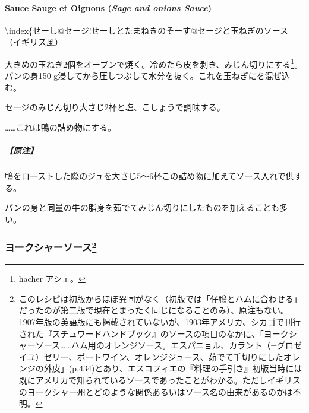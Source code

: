\begin{recette}
\hypertarget{sage-and-onions-sauce}{%
\paragraph{\texorpdfstring{Sauce Sauge et Oignons (\emph{Sage and onions
Sauce})}{Sauce Sauge et Oignons (Sage and onions Sauce)}}\label{sage-and-onions-sauce}}

\textbackslash{}index\{せーし@セージ!せーしとたまねきのそーす@セージと玉ねぎのソース（イギリス風）

大きめの玉ねぎ2個をオーブンで焼く。冷めたら皮を剥き、みじん切りにする\footnote{hacher
  アシェ。}。パンの身150
g浸してから圧しつぶして水分を抜く。これを玉ねぎにを混ぜ込む。

セージのみじん切り大さじ2杯と塩、こしょうで調味する。

\ldots{}\ldots{}これは鴨の詰め物にする。

\hypertarget{ux539fux6ce8-3}{%
\subparagraph{【原注】}\label{ux539fux6ce8-3}}

鴨をローストした際のジュを大さじ5〜6杯この詰め物に加えてソース入れで供する。

パンの身と同量の牛の脂身を茹でてみじん切りにしたものを加えることも多い。

\maeaki

\hypertarget{ux30e8ux30fcux30afux30b7ux30e3ux30fcux30bdux30fcux30b953}{%
\subsubsection[ヨークシャーソース]{\texorpdfstring{ヨークシャーソース\footnote{このレシピは初版からほぼ異同がなく（初版では「仔鴨とハムに合わせる」だったのが第二版で現在とまったく同じになることのみ）、原注もない。1907年版の英語版にも掲載されていないが、1903年アメリカ、シカゴで刊行された『\href{https://archive.org/details/stewardshandbook00whitiala}{スチュワードハンドブック}』のソースの項目のなかに、「ヨークシャーソース\ldots{}\ldots{}ハム用のオレンジソース。エスパニョル、カラント（=グロゼイユ）ゼリー、ポートワイン、オレンジジュース、茹でて千切りにしたオレンジの外皮」(p.434)とあり、エスコフィエの『料理の手引き』初版当時には既にアメリカで知られているソースであったことがわかる。ただしイギリスのヨークシャー州とどのような関係あるいはソース名の由来があるのかは不明。}}{ヨークシャーソース}}\label{ux30e8ux30fcux30afux30b7ux30e3ux30fcux30bdux30fcux30b953}}


\end{recette}

